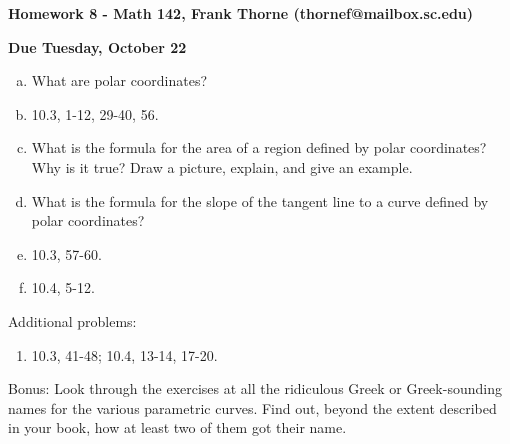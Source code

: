 \documentclass[12pt]{article}
\begin{document}
\setlength{\topmargin}{-2mm}





\begin{center}{\bf Homework 8 - Math 142, Frank Thorne (thornef@mailbox.sc.edu)}
\end{center}
\begin{center}
{\bf Due Tuesday, October 22}
\end{center}

\begin{enumerate}[(a)]
\item
What are polar coordinates?

\item
10.3, 1-12, 29-40, 56.

\item
What is the formula for the area of a region defined by polar coordinates? Why is it
true? Draw a picture, explain, and give an example.

\item
What is the formula for the slope of the tangent line to a curve defined by polar coordinates? 

\item
10.3, 57-60.

\item
10.4, 5-12.
\end{enumerate}

Additional problems:
\begin{enumerate}
\item
10.3, 41-48; 10.4, 13-14, 17-20.
\end{enumerate}
Bonus: Look through the exercises at all the ridiculous Greek or Greek-sounding
names for the various parametric curves. Find out, beyond the extent described in your
book, how at least two of them got their name.
\end{document}
